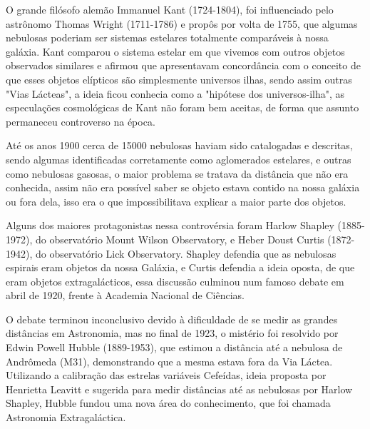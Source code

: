O grande filósofo alemão Immanuel Kant (1724-1804), foi influenciado pelo astrônomo Thomas Wright (1711-1786) e propôs por volta de 1755, que algumas nebulosas poderiam ser sistemas estelares totalmente comparáveis à nossa galáxia. Kant comparou o sistema estelar em que vivemos com outros objetos observados similares e afirmou que apresentavam concordância com o conceito de que esses objetos elípticos são simplesmente universos ilhas, sendo assim outras "Vias Lácteas", a ideia ficou conhecia como a "hipótese dos universos-ilha", as especulações cosmológicas de Kant não foram bem aceitas, de forma que assunto permaneceu controverso na época. 

Até os anos 1900 cerca de 15000 nebulosas haviam sido catalogadas e descritas, sendo algumas identificadas corretamente como aglomerados estelares, e outras como nebulosas gasosas, o maior problema se tratava da distância que não era conhecida, assim não era possível saber se objeto estava contido na nossa galáxia ou fora dela, isso era o que impossibilitava explicar a maior parte dos objetos. 

Alguns dos maiores protagonistas nessa controvérsia foram Harlow Shapley (1885-1972), do observatório Mount Wilson Observatory, e Heber Doust Curtis (1872-1942), do observatório Lick Observatory. Shapley defendia que as nebulosas espirais eram objetos da nossa Galáxia, e Curtis defendia a ideia oposta, de que eram objetos extragalácticos, essa discussão culminou num famoso debate em abril de 1920, frente à Academia Nacional de Ciências. 

O debate terminou inconclusivo devido à dificuldade de se medir as grandes distâncias em Astronomia, mas no final de 1923, o mistério foi resolvido por Edwin Powell Hubble (1889-1953), que estimou a distância até a nebulosa de Andrômeda (M31), demonstrando que a mesma estava fora da Via Láctea. Utilizando a calibração das estrelas variáveis Cefeídas, ideia proposta por Henrietta Leavitt e sugerida para medir distâncias até as nebulosas por Harlow Shapley, Hubble fundou uma nova área do conhecimento, que foi chamada Astronomia Extragaláctica. 

